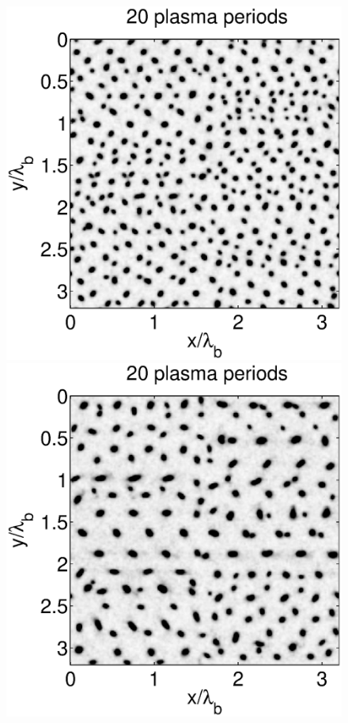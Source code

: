 \documentclass[conference]{IEEEtran}
\renewcommand{\~}{\widetilde }
\begin{document}
\begin{figure}[H]
\begin{center}
\begin{minipage}{0.40\columnwidth}
\begin{center}
			\includegraphics[width=1.0\columnwidth]{m_20_PIC.eps}
		\end{center}
	\end{minipage}%
	\begin{minipage}{0.40\columnwidth}
		\begin{center}
			\includegraphics[width=1.0\columnwidth]{m_20_EXP.eps}

\end{center}
\end{minipage}
\end{center}
\end{figure}
\end{document}
